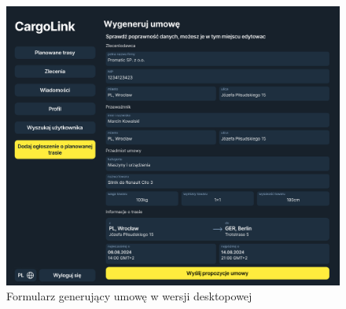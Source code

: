 \begin{figure}[H]
	\centering
		\includegraphics[width=0.7\linewidth]{rozdzial1/wygeneruj_umowe_d.jpg}
	\caption{Formularz generujący umowę w wersji desktopowej}
	\label{Rys. fig:Wygeneruj umowe - desktop}
\end{figure}

